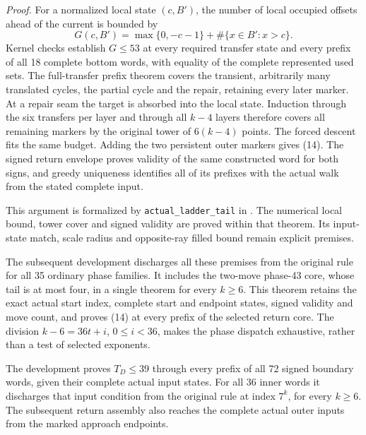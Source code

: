 \documentclass[11pt,a4paper]{article}
\begin{document}
\emph{Proof.} For a normalized local state $(c,B')$, the number of local
occupied offsets ahead of the current is bounded by
\[
G(c,B')=\max\{0,-c-1\}+\#\{x\in B':x>c\}.
\]
Kernel checks establish $G\le53$ at every required transfer state and
every prefix of all 18 complete bottom words, with equality of the
complete represented used sets. The full-transfer prefix theorem covers
the transient, arbitrarily many translated cycles, the partial cycle and
the repair, retaining every later marker. At a repair seam the target
is absorbed into the local state. Induction through the six transfers
per layer and through all $k-4$ layers therefore covers all remaining
markers by the original tower of $6(k-4)$ points. The forced descent fits
the same budget. Adding the two persistent outer markers gives (14).
The signed return envelope proves validity of the same constructed word
for both signs, and greedy uniqueness identifies all of its prefixes
with the actual walk from the stated complete input.

This argument is formalized by \texttt{actual\_ladder\_tail} in
.
The numerical local bound, tower cover and signed validity are proved
within that theorem. Its input-state match, scale radius and opposite-ray
filled bound remain explicit premises.

The subsequent  development discharges
all these premises from the original rule for all 35 ordinary phase
families. It includes the two-move phase-43 core, whose tail is
at most four, in a single theorem for every $k\ge6$. This theorem retains
the exact actual start index, complete start and endpoint states, signed
validity and move count, and proves (14) at every prefix of the selected
return core. The division $k-6=36t+i$, $0\le i<36$, makes the phase
dispatch exhaustive, rather than a test of selected exponents.

The  development proves
$T_D\le39$ through every prefix of all 72 signed boundary words, given
their complete actual input states. For all 36 inner words it discharges
that input condition from the original rule at index $7^k$, for every
$k\ge6$. The subsequent return assembly also reaches the complete actual
outer inputs from the marked approach endpoints.
\end{document}
